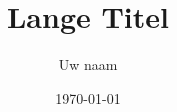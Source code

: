 \documentclass{beamer}
\title[Korte titel]{Lange Titel} %
\author{Uw naam} %
\institute[HoGent - neem ik aan] %
{
Hogeschool Gent \\ %
\medskip
\textit{email adres} %
}
\date{\today} %
\begin{document}
\begin{frame}
\titlepage %
\end{frame}




%












\end{document}
